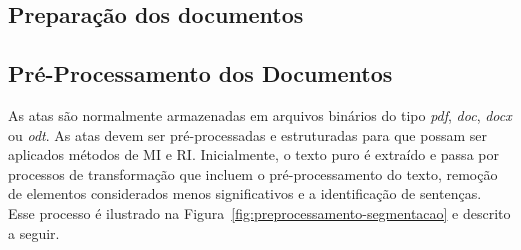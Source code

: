 
























\subsection{Preparação dos documentos}




\subsection{Pré-Processamento dos Documentos}

As atas são normalmente armazenadas em arquivos binários do tipo \textit{pdf}, \textit{doc}, \textit{docx} ou \textit{odt}. As atas devem ser pré-processadas e estruturadas para que possam ser aplicados métodos de MI e RI. Inicialmente, o texto puro é extraído e passa por processos de transformação que incluem o pré-processamento do texto, remoção de elementos considerados menos significativos e a identificação de sentenças. Esse processo é ilustrado na Figura~\ref{fig:preprocessamento-segmentacao} e descrito a seguir.

	

